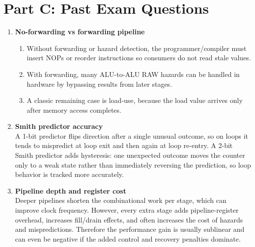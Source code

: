 \documentclass[11pt]{article}
\begin{document}
\section*{Part C: Past Exam Questions}
\begin{enumerate}[label=\textbf{C\arabic*.}]
  \item \textbf{No-forwarding vs forwarding pipeline}
  \begin{enumerate}[label=(\alph*)]
    \item Without forwarding or hazard detection, the programmer/compiler must insert NOPs or reorder instructions so consumers do not read stale values.
    \item With forwarding, many ALU-to-ALU RAW hazards can be handled in hardware by bypassing results from later stages.
    \item A classic remaining case is load-use, because the load value arrives only after memory access completes.
  \end{enumerate}

  \item \textbf{Smith predictor accuracy}
  \\[0.5ex]
  A 1-bit predictor flips direction after a single unusual outcome, so on loops it tends to mispredict at loop exit and then again at loop re-entry. A 2-bit Smith predictor adds hysteresis: one unexpected outcome moves the counter only to a weak state rather than immediately reversing the prediction, so loop behavior is tracked more accurately.

  \item \textbf{Pipeline depth and register cost}
  \\[0.5ex]
  Deeper pipelines shorten the combinational work per stage, which can improve clock frequency. However, every extra stage adds pipeline-register overhead, increases fill/drain effects, and often increases the cost of hazards and mispredictions. Therefore the performance gain is usually sublinear and can even be negative if the added control and recovery penalties dominate.
\end{enumerate}
\end{document}

